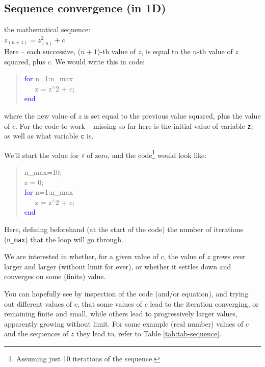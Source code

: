 \documentclass{tufte-book} %
\newenvironment{docspec}{\begin{quotation}\ttfamily\parskip0pt\parindent0pt\ignorespaces}{\end{quotation}}
\begin{document}

\subsection{Sequence convergence (in 1D)}

\vspace{-2mm}
 the mathematical sequence:
\vspace{1mm}
\\\(z_{(n+1)}=z^{2}_{(n)}+c\)
\vspace{2mm}
\\\noindent Here -- each successive, (\(n+1\))-th value of \(z\), is equal to the \(n\)-th value of \(z\) squared, plus \(c\). We would write this in code:
\begin{docspec}
\textcolor{blue}{for} n=1:n\_max\\
\ \ \ z = z\(^{\wedge}\)2 + c;\\
\textcolor{blue}{end}
\end{docspec}
\noindent where the new value of \texttt{\(z\)} is set equal to the previous value squared, plus the value of \texttt{\(c\)}. For the code to work -- missing so far here is the initial value of variable \texttt{z}, as well as what variable \texttt{c} is.

We'll start the value for \(z\) of zero, and the code\footnote[][0.25in]{Assuming just 10 iterations of the sequence.} would look like: 
\begin{docspec}
n\_max=10;\\
z = 0;\\
\textcolor{blue}{for} n=1:n\_max\\
\ \ \ z = z\(^{\wedge}\)2 + c;\\
\textcolor{blue}{end}
\end{docspec}
Here,  defining beforehand (at the start of the code) the number of iterations (\texttt{n\_max}) that the loop will go through.

We are interested in whether, for a given value of \(c\), the value of \(z\) grows ever larger and larger (without limit for ever), or whether it settles down and converges on some (finite) value.

You can hopefully see by inspection of the code (and/or equation), and trying out different values of \(c\), that some values of \(c\) lead to the iteration converging, or remaining finite and small, while others lead to progressively larger values, apparently growing without limit. For some example (real number) values of \(c\) and the sequences of \(z\) they lead to, refer to Table \ref{tab:tab-sequence}.
\end{document}
